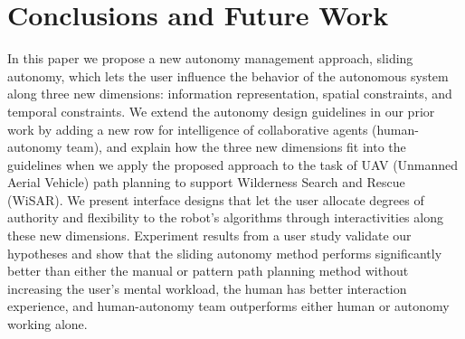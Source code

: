 %

\section{Conclusions and Future Work} 
\label{sec:Conclusions6}

In this paper we propose a new autonomy management approach, sliding autonomy, which lets the user influence the behavior of the autonomous system along three new dimensions: information representation, spatial constraints, and temporal constraints. We extend the autonomy design guidelines in our prior work by adding a new row for intelligence of collaborative agents (human-autonomy team), and explain how the three new dimensions fit into the guidelines when we apply the proposed approach to the task of UAV (Unmanned Aerial Vehicle) path planning to support Wilderness Search and Rescue (WiSAR). We present interface designs that let the user allocate degrees of authority and flexibility to the robot's algorithms through interactivities along these new dimensions. Experiment results from a user study validate our hypotheses and show that the sliding autonomy method performs significantly better than either the manual or pattern path planning method without increasing the user's mental workload, the human has better interaction experience, and human-autonomy team outperforms either human or autonomy working alone.

